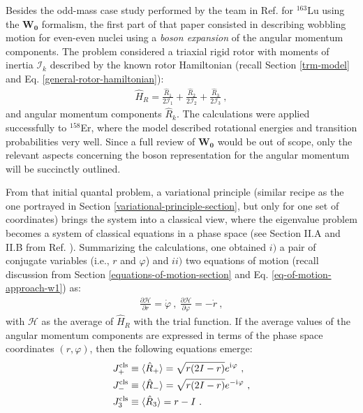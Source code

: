 Besides the odd-mass case study performed by the team in Ref. \cite{raduta2017semiclassical} for $^{163}$Lu using the $\mathbf{W_0}$ formalism, the first part of that paper consisted in describing wobbling motion for even-even nuclei using a \emph{boson expansion} of the angular momentum components. The problem considered a triaxial rigid rotor with moments of inertia $\mathcal{I}_k$ described by the known rotor Hamiltonian (recall Section \ref{trm-model} and Eq. \ref{general-rotor-hamiltonian}):
\begin{align}
    \hat{H}_R=\frac{\hat{R}_1}{2\mathcal{I}_1}+\frac{\hat{R}_2}{2\mathcal{I}_2}+\frac{\hat{R}_3}{2\mathcal{I}_3}\ ,
\end{align}
and angular momentum components $\hat{R}_k$. The calculations were applied successfully to $^{158}$Er, where the model described rotational energies and transition probabilities very well. Since a full review of $\mathbf{W_0}$ would be out of scope, only the relevant aspects concerning the boson representation for the angular momentum will be succinctly outlined.

From that initial quantal problem, a variational principle (similar recipe as the one portrayed in Section \ref{variational-principle-section}, but only for one set of coordinates) brings the system into a classical view, where the eigenvalue problem becomes a system of classical equations in a phase space (see Section II.A and II.B from Ref. \cite{raduta2017semiclassical}). Summarizing the calculations, one obtained $i)$ a pair of conjugate variables (i.e., $r$ and $\varphi$) and $ii)$ two equations of motion (recall discussion from Section \ref{equations-of-motion-section} and Eq. \ref{eq-of-motion-approach-w1}) as:
\begin{align}
    \frac{\partial\mathcal{H}}{\partial r}=\dot{\varphi}\ ,\ \frac{\partial\mathcal{H}}{\partial\varphi}=-\dot{r}\ ,
\end{align}
with $\mathcal{H}$ as the average of $\hat{H}_R$ with the trial function. If the average values of the angular momentum components are expressed in terms of the phase space coordinates $(r,\varphi)$, then the following equations emerge:
\begin{align}
    J_+^\text{cls}&\equiv\langle\hat{R}_+\rangle=\sqrt{r(2I-r)}e^{\iu\varphi}\ ,\nonumber \\
    J_-^\text{cls}&\equiv\langle\hat{R}_-\rangle=\sqrt{r(2I-r)}e^{-\iu\varphi}\ ,\nonumber \\
    J_3^\text{cls}&\equiv\langle\hat{R}_3\rangle=r-I\ .
    \label{classical-am-components-boson}
\end{align} 

